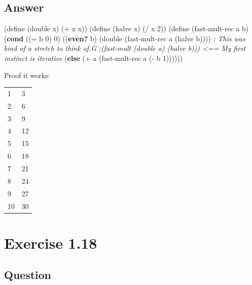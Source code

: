 \documentclass[
]{article}
\newenvironment{Shaded}{}{}
\newcommand{\CommentTok}[1]{\textcolor[rgb]{0.38,0.63,0.69}{\textit{#1}}}
\newcommand{\DecValTok}[1]{\textcolor[rgb]{0.25,0.63,0.44}{#1}}
\newcommand{\ExtensionTok}[1]{#1}
\newcommand{\FunctionTok}[1]{\textcolor[rgb]{0.02,0.16,0.49}{#1}}
\newcommand{\KeywordTok}[1]{\textcolor[rgb]{0.00,0.44,0.13}{\textbf{#1}}}
\newcommand{\NormalTok}[1]{#1}
\newcommand{\OperatorTok}[1]{\textcolor[rgb]{0.40,0.40,0.40}{#1}}
\begin{document}
\hypertarget{answer-15}{%
\subsection{Answer}\label{answer-15}}

\hypertarget{fast-mult-rec}{%
\label{fast-mult-rec}}%
\begin{Shaded}
\begin{Highlighting}[numbers=left,,]
\NormalTok{(}\ExtensionTok{define}\FunctionTok{ }\NormalTok{(double x)}
\NormalTok{  (}\OperatorTok{+}\NormalTok{ x x))}
\NormalTok{(}\ExtensionTok{define}\FunctionTok{ }\NormalTok{(halve x)}
\NormalTok{  (}\OperatorTok{/}\NormalTok{ x }\DecValTok{2}\NormalTok{))}
\NormalTok{(}\ExtensionTok{define}\FunctionTok{ }\NormalTok{(fast{-}mult{-}rec a b)}
\NormalTok{  (}\KeywordTok{cond}\NormalTok{ ((}\OperatorTok{=}\NormalTok{ b }\DecValTok{0}\NormalTok{) }\DecValTok{0}\NormalTok{)}
\NormalTok{        ((}\KeywordTok{even?}\NormalTok{ b)}
\NormalTok{         (double (fast{-}mult{-}rec a (halve b)))) }\CommentTok{; This was kind of a stretch to think of.G}
         \CommentTok{;(fast{-}mult (double a) (halve b))) \textless{}== My first instinct is iterative}
\NormalTok{        (}\KeywordTok{else}\NormalTok{ (}\OperatorTok{+}\NormalTok{ a (fast{-}mult{-}rec a (}\OperatorTok{{-}}\NormalTok{ b }\DecValTok{1}\NormalTok{))))))}
\end{Highlighting}
\end{Shaded}

Proof it works:

\begin{longtable}[]{@{}ll@{}}
\toprule
\endhead
1 & 3 \\
2 & 6 \\
3 & 9 \\
4 & 12 \\
5 & 15 \\
6 & 18 \\
7 & 21 \\
8 & 24 \\
9 & 27 \\
10 & 30 \\
\bottomrule
\end{longtable}

\hypertarget{exercise-1.18}{%
\section{Exercise 1.18}\label{exercise-1.18}}

\hypertarget{question-16}{%
\subsection{Question}\label{question-16}}
\end{document}
